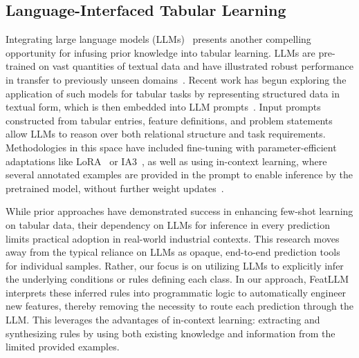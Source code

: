\subsection{Language-Interfaced Tabular Learning} Integrating large language models (LLMs)~\cite{anil2023palm,openai2023gpt4} presents another compelling opportunity for infusing prior knowledge into tabular learning. LLMs are pre-trained on vast quantities of textual data and have illustrated robust performance in transfer to previously unseen domains~\cite{brown2020language}. Recent work has begun exploring the application of such models for tabular tasks by representing structured data in textual form, which is then embedded into LLM prompts~\cite{dinh2022lift,hegselmann2023tabllm,wang2023anypredict}. Input prompts constructed from tabular entries, feature definitions, and problem statements allow LLMs to reason over both relational structure and task requirements. Methodologies in this space have included fine-tuning with parameter-efficient adaptations like LoRA~\cite{hu2021lora} or IA3~\cite{liu2022few}, as well as using in-context learning, where several annotated examples are provided in the prompt to enable inference by the pretrained model, without further weight updates~\cite{dinh2022lift,hegselmann2023tabllm,nam2023semi,slack2023tablet}.

While prior approaches have demonstrated success in enhancing few-shot learning on tabular data, their dependency on LLMs for inference in every prediction limits practical adoption in real-world industrial contexts. This research moves away from the typical reliance on LLMs as opaque, end-to-end prediction tools for individual samples. Rather, our focus is on utilizing LLMs to explicitly infer the underlying conditions or rules defining each class. In our approach, \textsf{FeatLLM} interprets these inferred rules into programmatic logic to automatically engineer new features, thereby removing the necessity to route each prediction through the LLM. This leverages the advantages of in-context learning: extracting and synthesizing rules by using both existing knowledge and information from the limited provided examples.

